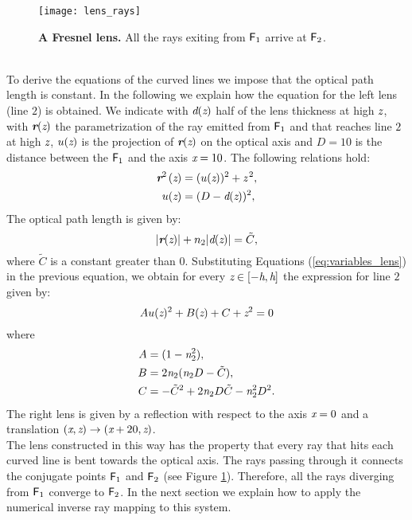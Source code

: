 \begin{figure}[t]
  \begin{center}
  \texttt{[image: lens\_rays]}
  \end{center}
  \caption{\textbf{A Fresnel lens.} 
All the rays exiting from $\textsf{F}_1$ arrive at $\textsf{F}_2$.}
\label{fig:real-lens}
 \end{figure}
\\ \indent To derive the equations of the curved lines we impose that the optical path length is constant. In the following we explain how the equation for the left lens (line $2$) is obtained. We indicate with $\textit{d}(\textit{z})$ half of the lens thickness at high $\textit{z}$, with $\textit{\textbf{r}}(\textit{z})$ the parametrization of the ray emitted from $\textsf{F}_1$ and that reaches line $2$ at high $\textit{z}$, $u(\textit{z})$ is the projection of $\textit{\textbf{r}}(\textit{z})$ on the optical axis and $D=10$ is the distance between the $\textsf{F}_1$ and the axis $\textit{x}=10$.
The following relations hold:
\begin{equation}\label{eq:variables_lens}
\begin{aligned}
\textit{\textbf{r}}^{2\,}(\textit{z}) &= (u(\textit{z}))^2+\textit{z}^{\,2},\\
u(\textit{z}) &= (D-\textit{d}(\textit{z}))^2, 
\end{aligned}
\end{equation}
The optical path length is given by:
\begin{equation}\label{eq:path_length}
|\textit{\textbf{r}}(\textit{z})|+n_2|\textit{d}(\textit{z})|=\tilde{C},
\end{equation}  
where $\tilde{C}$ is a constant greater than $0$. Substituting Equations (\ref{eq:variables_lens}) in the previous equation,
we obtain for every $\textit{z}\in[-\textit{h}, \textit{h}]$ the expression for line $2$ given by:
\begin{equation}
Au(\textit{z})^2+B(\textit{z})+C+\textit{z}^2 = 0
\end{equation}
where 
\begin{equation}
\begin{aligned}
A & = (1-\textit{n}_2^2), \\
B & = 2\textit{n}_2(\textit{n}_2 D-\tilde{C}), \\
C & = -\tilde{C}^2+2\textit{n}_2 D\tilde{C}-\textit{n}_2^2D^2. \\
\end{aligned}
\end{equation}
The right lens is given by a reflection with respect to the axis $\textit{x}=0$ and a translation $(\textit{x}, \textit{z})\rightarrow (\textit{x}+20, \textit{z})$.
\\ \indent The lens constructed in this way has the property that every ray that hits each curved line is bent towards the optical axis. The rays passing through it connects the conjugate points $\textsf{F}_1 $ and $\textsf{F}_2$ (see Figure \ref{fig:real-lens}). Therefore, all the rays diverging from $\textsf{F}_1$ converge to $\textsf{F}_2$. In the next section we explain how to apply the numerical inverse ray mapping to this system.
